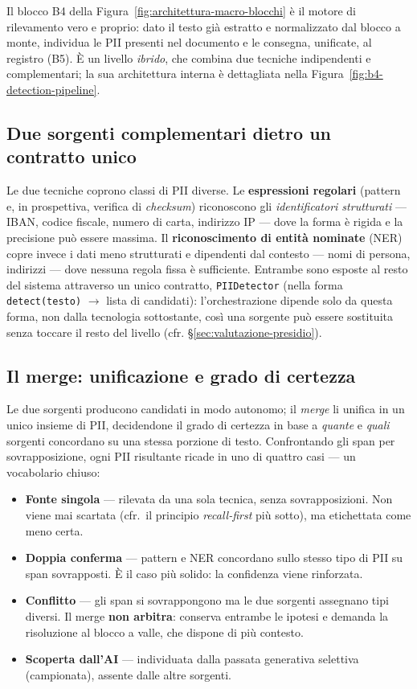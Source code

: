 Il blocco B4 della Figura~\ref{fig:architettura-macro-blocchi} è il motore di rilevamento vero e proprio: dato il testo già estratto e normalizzato dal blocco a monte, individua le PII presenti nel documento e le consegna, unificate, al registro (B5). È un livello \emph{ibrido}, che combina due tecniche indipendenti e complementari; la sua architettura interna è dettagliata nella Figura~\ref{fig:b4-detection-pipeline}.

\subsection{Due sorgenti complementari dietro un contratto unico}
\label{sub:b4-sorgenti}

Le due tecniche coprono classi di PII diverse. Le \textbf{espressioni regolari} (pattern e, in prospettiva, verifica di \emph{checksum}) riconoscono gli \emph{identificatori strutturati} --- IBAN, codice fiscale, numero di carta, indirizzo IP --- dove la forma è rigida e la precisione può essere massima. Il \textbf{riconoscimento di entità nominate} (NER) copre invece i dati meno strutturati e dipendenti dal contesto --- nomi di persona, indirizzi --- dove nessuna regola fissa è sufficiente. Entrambe sono esposte al resto del sistema attraverso un unico contratto, \texttt{PIIDetector} (nella forma \texttt{detect(testo)} $\rightarrow$ lista di candidati): l'orchestrazione dipende solo da questa forma, non dalla tecnologia sottostante, così una sorgente può essere sostituita senza toccare il resto del livello (cfr. §\ref{sec:valutazione-presidio}).

\subsection{Il merge: unificazione e grado di certezza}
\label{sub:b4-merge}

Le due sorgenti producono candidati in modo autonomo; il \emph{merge} li unifica in un unico insieme di PII, decidendone il grado di certezza in base a \emph{quante} e \emph{quali} sorgenti concordano su una stessa porzione di testo. Confrontando gli span per sovrapposizione, ogni PII risultante ricade in uno di quattro casi --- un vocabolario chiuso:

\begin{itemize}
	\item \textbf{Fonte singola} --- rilevata da una sola tecnica, senza sovrapposizioni. Non viene mai scartata (cfr.\ il principio \emph{recall-first} più sotto), ma etichettata come meno certa.
	\item \textbf{Doppia conferma} --- pattern e NER concordano sullo stesso tipo di PII su span sovrapposti. È il caso più solido: la confidenza viene rinforzata.
	\item \textbf{Conflitto} --- gli span si sovrappongono ma le due sorgenti assegnano tipi diversi. Il merge \textbf{non arbitra}: conserva entrambe le ipotesi e demanda la risoluzione al blocco a valle, che dispone di più contesto.
	\item \textbf{Scoperta dall'AI} --- individuata dalla passata generativa selettiva (campionata), assente dalle altre sorgenti.
\end{itemize}


